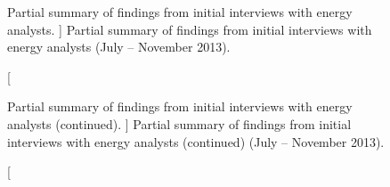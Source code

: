 

\begin{figure}
	\centering
	\caption
	[
	    Partial summary of findings from initial interviews with energy analysts.
	]
	{
    	Partial summary of findings from initial interviews with energy analysts (July -- November 2013).  
	}
	\centering
	\label{app:emu:fig:interview-summaries}
\end{figure}



\begin{figure}
	\centering
	\caption
	[
	    Partial summary of findings from initial interviews with energy analysts (continued).
	]
	{
    	Partial summary of findings from initial interviews with energy analysts (continued) (July -- November 2013).  
	}
	\centering
	\label{app:emu:fig:interview-summaries-2}
\end{figure}

